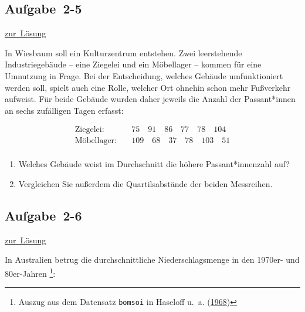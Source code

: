 \documentclass[
  11pt,
  ngerman,
  a4paper,
]{report}
\begin{document}
\hypertarget{aufgabe-2-5}{%
\subsection{Aufgabe~2-5}\label{aufgabe-2-5}}

\protect\hyperlink{loesung-2-5}{zur~Lösung}

In Wiesbaum soll ein Kulturzentrum entstehen. Zwei leerstehende Industriegebäude -- eine Ziegelei und ein Möbellager -- kommen für eine Umnutzung in Frage. Bei der Entscheidung, welches Gebäude umfunktioniert werden soll, spielt auch eine Rolle, welcher Ort ohnehin schon mehr Fußverkehr aufweist. Für beide Gebäude wurden daher jeweils die Anzahl der Passant*innen an sechs zufälligen Tagen erfasst:

\[\begin{aligned}
\textrm{Ziegelei}: \quad & 75\quad91\quad86\quad77\quad78\quad104\\
\textrm{Möbellager}: \quad & 109\quad68\quad37\quad78\quad103\quad51\\
\end{aligned}\]

\begin{enumerate}
\def\labelenumi{\alph{enumi})}
\item
  Welches Gebäude weist im Durchschnitt die höhere Passant*innenzahl auf?
\item
  Vergleichen Sie außerdem die Quartilsabstände der beiden Messreihen.
\end{enumerate}

\hypertarget{aufgabe-2-6}{%
\subsection{Aufgabe~2-6}\label{aufgabe-2-6}}

\protect\hyperlink{loesung-2-6}{zur~Lösung}

In Australien betrug die durchschnittliche Niederschlagsmenge in den 1970er- und 80er-Jahren \footnote{Auszug aus dem Datensatz \texttt{bomsoi} in Haseloff u.~a. (\protect\hyperlink{ref-haseloff}{1968})}:
\nopagebreak
\end{document}
